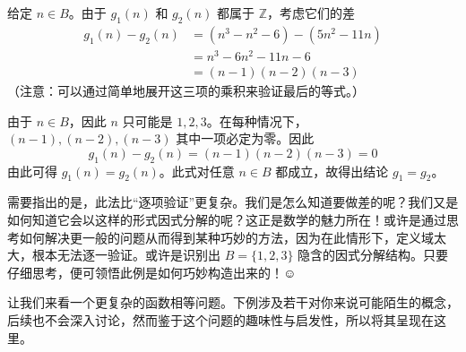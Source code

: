 给定 $n \in B$。由于 $g_1(n)$ 和 $g_2(n)$ 都属于 $\mathbb{Z}$，考虑它们的差
\begin{align*}
    g_1(n) - g_2(n) &= (n^3 - n^2 - 6) - (5n^2 - 11n) \\
    &= n^3 - 6n^2 - 11n - 6 \\
    &= (n - 1)(n - 2)(n - 3)
\end{align*}
（注意：可以通过简单地展开这三项的乘积来验证最后的等式。）

由于 $n \in B$，因此 $n$ 只可能是 $1,2,3$。在每种情况下，$(n - 1), (n - 2), (n - 3)$ 其中一项必定为零。因此
\[g_1(n) - g_2(n) = (n - 1)(n - 2)(n - 3) = 0\]
由此可得 $g_1(n) = g_2(n)$。此式对任意 $n \in B$ 都成立，故得出结论 $g_1 = g_2$。

需要指出的是，此法比``逐项验证''更复杂。我们是怎么知道要做差的呢？我们又是如何知道它会以这样的形式因式分解的呢？这正是数学的魅力所在！或许是通过思考如何解决更一般的问题从而得到某种巧妙的方法，因为在此情形下，定义域太大，根本无法逐一验证。或许是识别出 $B = \{1, 2, 3\}$ 隐含的因式分解结构。只要仔细思考，便可领悟此例是如何巧妙构造出来的！$\smiley{}$

让我们来看一个更复杂的函数相等问题。下例涉及若干对你来说可能陌生的概念，后续也不会深入讨论，然而鉴于这个问题的趣味性与启发性，所以将其呈现在这里。

